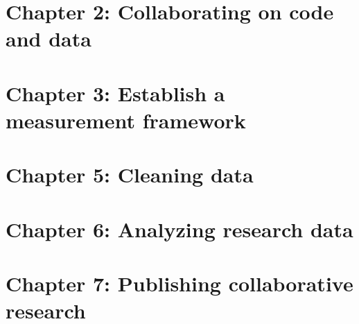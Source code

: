\chapter{Chapter 2: Collaborating on code and data}
\label{ch:2}





\chapter{Chapter 3: Establish a measurement framework}
\label{ch:4}




\chapter{Chapter 5: Cleaning data}
\label{ch:5}




\chapter{Chapter 6: Analyzing research data}
\label{ch:6}




\chapter{Chapter 7: Publishing collaborative research}
\label{ch:7}



